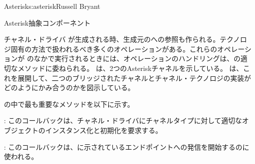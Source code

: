 \begin{aosachapter}{Asterisk}{s:asterisk}{Russell Bryant}
\begin{aosasect1}{Asterisk抽象コンポーネント}
\begin{aosasect2}{チャネル・ドライバ}
 が生成される時、生成元のへの参照も作られる。テクノロジ固有の方法で扱われるべき多くのオペレーションがある。これらのオペレーションが のなかで実行されるときには、オペレーションのハンドリングは、の適切なメソッドに委ねられる。 は、2つのAsteriskチャネルを示している。 は、これを展開して、二つのブリッジされたチャネルとチャネル・テクノロジの実装がどのようにかみ合うのかを図示している。


 の中で最も重要なメソッドを以下に示す。

\begin{aosaitemize}

\item {}: このコールバックは、チャネル・ドライバにチャネルタイプに対して適切なオブジェクトのインスタンス化と初期化を要求する。

\item {}: このコールバックは、に示されているエンドポイントへの発信を開始するのに使われる。


\end{aosaitemize}
\end{aosasect2}
\end{aosasect1}
\end{aosachapter}
